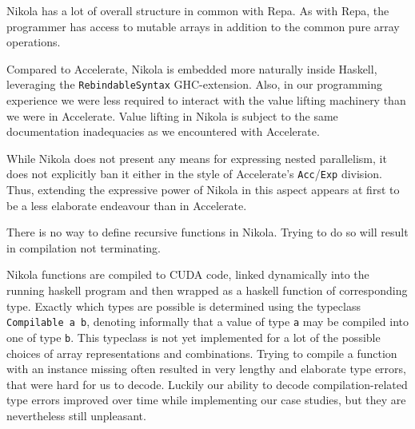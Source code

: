 Nikola has a lot of overall structure in common with Repa. As with Repa, the
programmer has access to mutable arrays in addition to the common pure array
operations.

Compared to Accelerate, Nikola is embedded more naturally inside Haskell,
leveraging the \texttt{RebindableSyntax} GHC-extension. Also, in our programming
experience we were less required to interact with the value lifting machinery
than we were in Accelerate. Value lifting in Nikola is subject to the same
documentation inadequacies as we encountered with Accelerate.

While Nikola does not present any means for expressing nested parallelism, it
does not explicitly ban it either in the style of Accelerate's
\texttt{Acc}/\texttt{Exp} division. Thus, extending the expressive power of
Nikola in this aspect appears at first to be a less elaborate endeavour than in
Accelerate.

There is no way to define recursive functions in Nikola. Trying to do so
will result in compilation not terminating.

Nikola functions are compiled to CUDA code, linked dynamically into the running
haskell program and then wrapped as a haskell function of corresponding type.
Exactly which types are possible is determined using the typeclass
\texttt{Compilable a b}, denoting informally that a value of type \texttt{a}
may be compiled into one of type \texttt{b}. This typeclass is not yet
implemented for a lot of the possible choices of array representations and
combinations. Trying to compile a function with an instance missing often
resulted in very lengthy and elaborate type errors, that were hard for us to
decode. Luckily our ability to decode compilation-related type errors improved
over time while implementing our case studies, but they are nevertheless still
unpleasant.

